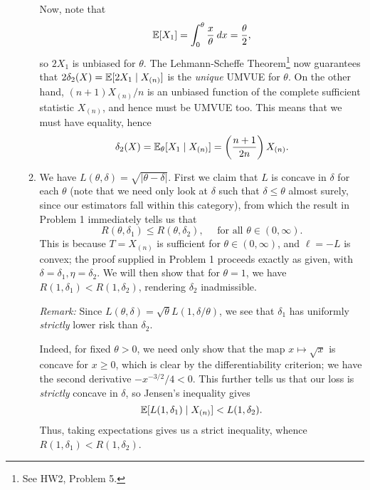 \documentclass[11pt]{article}
\begin{document}
\begin{enumerate}
\begin{enumerate}
            Now, note that \[
                \mathbb{E}[X_1] = \int_0^\theta \frac{x}{\theta} \:dx = \frac{\theta}{2},
            \] so $2X_1$ is unbiased for $\theta$.
            The Lehmann-Scheffe Theorem\footnote{See HW2, Problem 5.} now
            guarantees that $2\delta_2(X) = \mathbb{E}[2X_1 \mid X_{(n)}]$ is the
            \emph{unique} UMVUE for $\theta$.
            On the other hand, $(n + 1) X_{(n)} / n$ is an unbiased function of
            the complete sufficient statistic $X_{(n)}$, and hence must be
            UMVUE too.
            This means that we must have equality, hence \[
                \delta_2(X) = \mathbb{E}_\theta[X_1\mid X_{(n)}] = \left(\frac{n + 1}{2n}\right) X_{(n)}.
            \]


            \item We have $L(\theta, \delta) = \sqrt{|\theta - \delta|}$.
            First we claim that $L$ is concave in $\delta$ for each $\theta$
            (note that we need only look at $\delta$ such that $\delta \leq
            \theta$ almost surely, since our estimators fall within this
            category), from which the result in Problem 1 immediately tells us
            that \[
                R(\theta, \delta_1) \leq R(\theta, \delta_2), \quad \text{ for all } \theta \in (0, \infty).
            \] This is because $T = X_{(n)}$ is sufficient for $\theta \in (0,
            \infty)$, and $\ell = -L$ is convex; the proof supplied in Problem
            1 proceeds exactly as given, with $\delta = \delta_1, \eta = \delta_2$.
            We will then show that for $\theta = 1$, we have $R(1, \delta_1) <
            R(1, \delta_2)$, rendering $\delta_2$ inadmissible.

            \emph{Remark:} Since $L(\theta, \delta) = \sqrt{\theta} L(1, \delta
            / \theta)$, we see that $\delta_1$ has uniformly \emph{strictly}
            lower risk than $\delta_2$.

            Indeed, for fixed $\theta > 0$, we need only show that the map $x
            \mapsto \sqrt{x}$ is concave for $x \geq 0$, which is clear by
            the differentiability criterion; we have the second derivative
            $-x^{-3/2} / 4 < 0$.
            This further tells us that our loss is \emph{strictly} concave in
            $\delta$, so Jensen's inequality gives \[
                \mathbb{E}[L(1, \delta_1) \mid X_{(n)}] < L(1, \delta_2).
            \] Thus, taking expectations gives us a strict inequality, whence
            $R(1, \delta_1) < R(1, \delta_2)$.
        \end{enumerate}




\end{enumerate}
\end{document}
